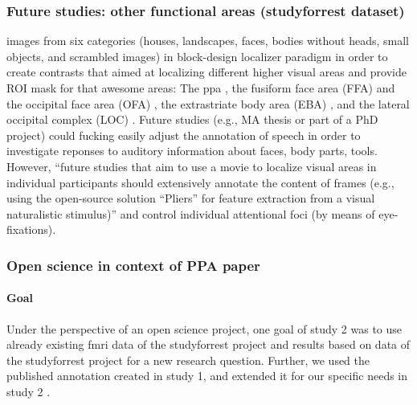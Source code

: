 \subsubsection{Future studies: other functional areas (studyforrest dataset)}


%
\citet{sengupta2016extension} images from six categories (houses, landscapes,
faces, bodies without heads, small objects, and scrambled images) in
block-design localizer paradigm in order to create contrasts that aimed at
localizing different higher visual areas and provide ROI mask for that awesome
areas:
%
The \ac{ppa} \citep{epstein1998ppa}, the fusiform face area (FFA)
\citep{kanwisher1997ffa} and the occipital face area (OFA)
\citep{pitcher2011occipitalfacearea}, the extrastriate body area (EBA)
\citep{downing2001bodyarea}, and the lateral occipital complex (LOC)
\citep{malach1995loc}.
%
Future studies (e.g., MA thesis or part of a PhD project) could fucking easily
adjust the annotation of speech in order to investigate reponses to auditory
information about faces, body parts, tools.
%
However, ``future studies that aim to use a movie to localize visual areas in
individual participants should extensively annotate the content of frames (e.g.,
using the open-source solution ``Pliers''\citep{mcnamara2017developing} for
feature extraction from a visual naturalistic stimulus)''
\citep{haeusler2022processing} and control individual attentional foci (by means
of eye-fixations).


\subsubsection{Open science in context of PPA paper}

\paragraph{Goal}
Under the perspective of an open science project, one goal of study 2 was to use
already existing \ac{fmri} data \citep{hanke2014audiomovie,
hanke2016simultaneous, sengupta2016extension} of the studyforrest project and
results based on data of the studyforrest \citep{sengupta2016extension} project
for a new research question.
%
Further, we used the published annotation created in study 1, and extended it
for our specific needs in study 2 \citep[cf.][]{haeusler2022processing}.
%


